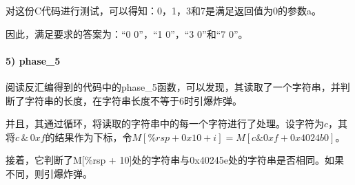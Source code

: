 \documentclass{article}
\begin{document}
对这份C代码进行测试，可以得知：0，1，3和7是满足返回值为0的参数a。

因此，满足要求的答案为：“0 0”，“1 0”，“3 0”和“7 0”。

\paragraph{5) phase\_5}

阅读反汇编得到的代码中的phase\_5函数，可以发现，其读取了一个字符串，并判断了字符串的长度，在字符串长度不等于6时引爆炸弹。

并且，其通过循环，将读取的字符串中的每一个字符进行了处理。设字符为$c$，其将$c\,\&\,0xf$的结果作为下标，令$M[\%rsp + 0x10 + i]=M[c\&0xf + 0x4024b0]$。

接着，它判断了M[\%rsp + 10]处的字符串与0x40245e处的字符串是否相同。如果不同，则引爆炸弹。
\end{document}
